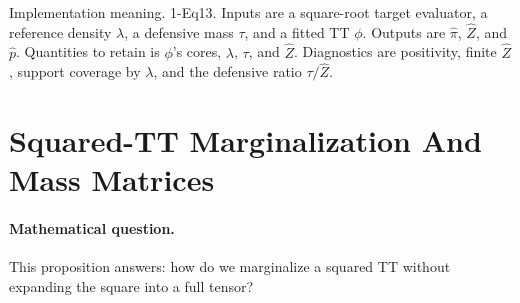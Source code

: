 \documentclass[11pt]{article}
\numberwithin{equation}{section}
\begin{document}
\begin{center}
\end{center}

Implementation meaning. 1-Eq13.  Inputs are a square-root target
evaluator, a reference density \(\lambda\), a defensive mass \(\tau\), and a
fitted TT \(\phi\).  Outputs are \(\widehat\pi\), \(\widehat Z\), and
\(\widehat p\).  Quantities to retain is \(\phi\)'s cores, \(\lambda\), \(\tau\),
and \(\widehat Z\).  Diagnostics are positivity, finite \(\widehat Z\), support
coverage by \(\lambda\), and the defensive ratio \(\tau/\widehat Z\).

\section{Squared-TT Marginalization And Mass Matrices}

\paragraph{Mathematical question.}
This proposition answers: how do we marginalize a squared TT without expanding
the square into a full tensor?
\end{document}
